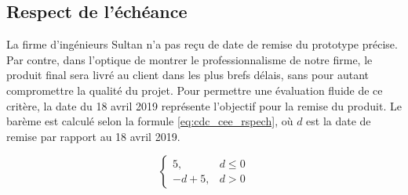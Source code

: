 

\subsection{Respect de l’échéance}
\label{s:cdc_cee_rspech}

La firme d’ingénieurs Sultan n’a pas reçu de date de remise du prototype précise.
Par contre, dans l’optique de montrer le professionnalisme de notre firme, le produit final sera livré au client dans les plus brefs délais, sans pour autant compromettre la qualité du projet.
Pour permettre une évaluation fluide de ce critère, la date du 18 avril 2019 représente l’objectif pour la remise du produit.
Le barème est calculé selon la formule \ref{eq:cdc_cee_rspech}, où $d$ est la date de remise par rapport au 18 avril 2019.

\begin{equation}
	\label{eq:cdc_cee_rspech}
	\left\{\begin{matrix}
		5, & d\le0\\ 
		-d+5, & d>0
	\end{matrix}\right.
\end{equation}